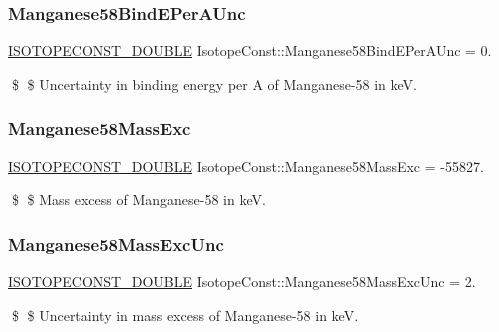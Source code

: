 \subsubsection{\texorpdfstring{Manganese58\+Bind\+E\+Per\+A\+Unc}{Manganese58BindEPerAUnc}}
{\footnotesize\ttfamily \mbox{\hyperlink{group___isotope_const-_macros_ga8f45a7272ce02c0b4c65c44636ed719a}{I\+S\+O\+T\+O\+P\+E\+C\+O\+N\+S\+T\+\_\+\+D\+O\+U\+B\+LE}} Isotope\+Const\+::\+Manganese58\+Bind\+E\+Per\+A\+Unc = 0.}

\$ \$ Uncertainty in binding energy per A of Manganese-\/58 in keV. \mbox{\label{group___isotope_const-_manganese-_mn58_ga9bff0f039b3c10b270b46618c1967b29}} 
\subsubsection{\texorpdfstring{Manganese58\+Mass\+Exc}{Manganese58MassExc}}
{\footnotesize\ttfamily \mbox{\hyperlink{group___isotope_const-_macros_ga8f45a7272ce02c0b4c65c44636ed719a}{I\+S\+O\+T\+O\+P\+E\+C\+O\+N\+S\+T\+\_\+\+D\+O\+U\+B\+LE}} Isotope\+Const\+::\+Manganese58\+Mass\+Exc = -\/55827.}

\$ \$ Mass excess of Manganese-\/58 in keV. \mbox{\label{group___isotope_const-_manganese-_mn58_ga18893e24c9e88532b2b786e6f3481fd3}} 
\subsubsection{\texorpdfstring{Manganese58\+Mass\+Exc\+Unc}{Manganese58MassExcUnc}}
{\footnotesize\ttfamily \mbox{\hyperlink{group___isotope_const-_macros_ga8f45a7272ce02c0b4c65c44636ed719a}{I\+S\+O\+T\+O\+P\+E\+C\+O\+N\+S\+T\+\_\+\+D\+O\+U\+B\+LE}} Isotope\+Const\+::\+Manganese58\+Mass\+Exc\+Unc = 2.}

\$ \$ Uncertainty in mass excess of Manganese-\/58 in keV. \mbox{\label{group___isotope_const-_manganese-_mn58_ga23b418514125225713213185bbea35ec}} 
